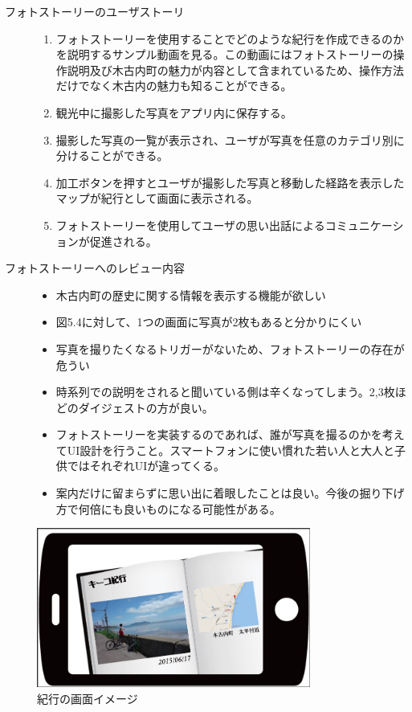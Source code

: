 \begin{description}
 \item[フォトストーリーのユーザストーリ]\mbox{}
 \begin{enumerate}
 \item フォトストーリーを使用することでどのような紀行を作成できるのかを説明するサンプル動画を見る。この動画にはフォトストーリーの操作説明及び木古内町の魅力が内容として含まれているため、操作方法だけでなく木古内の魅力も知ることができる。
  \item 観光中に撮影した写真をアプリ内に保存する。
 \item 撮影した写真の一覧が表示され、ユーザが写真を任意のカテゴリ別に分けることができる。
 \item 加工ボタンを押すとユーザが撮影した写真と移動した経路を表示したマップが紀行として画面に表示される。
 \item フォトストーリーを使用してユーザの思い出話によるコミュニケーションが促進される。
\end{enumerate}
\item[フォトストーリーへのレビュー内容]\mbox{}
 \begin{itemize}
 \item 木古内町の歴史に関する情報を表示する機能が欲しい
 \item 図5.4に対して、1つの画面に写真が2枚もあると分かりにくい
 \item 写真を撮りたくなるトリガーがないため、フォトストーリーの存在が危うい
 \item 時系列での説明をされると聞いている側は辛くなってしまう。2,3枚ほどのダイジェストの方が良い。
 \item フォトストーリーを実装するのであれば、誰が写真を撮るのかを考えてUI設計を行うこと。スマートフォンに使い慣れた若い人と大人と子供ではそれぞれUIが違ってくる。
 \item 案内だけに留まらずに思い出に着眼したことは良い。今後の掘り下げ方で何倍にも良いものになる可能性がある。
 \end{itemize}
\end{description}

\begin{figure}[htbp]
 \begin{center}
\includegraphics[width=9cm, bb=0 0 857 498]{5.1_kikou.png}
 \end{center}
\addtocounter{figure}{+0}
 \caption{紀行の画面イメージ}
 \label{fig:one}
\end{figure}
